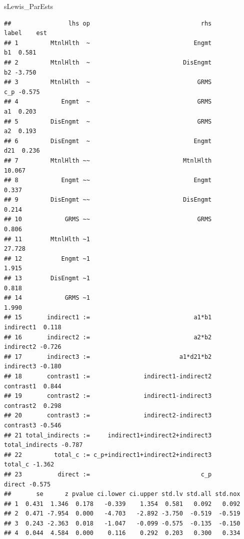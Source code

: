 \documentclass[
  11pt,
]{book}
\newenvironment{Shaded}{\begin{snugshade}}{\end{snugshade}}
\newcommand{\NormalTok}[1]{#1}
\begin{document}
\begin{Shaded}
\begin{Highlighting}[]
\NormalTok{sLewis\_ParEsts}
\end{Highlighting}
\end{Shaded}

\begin{verbatim}
##                lhs op                               rhs           label    est
## 1         MtnlHlth  ~                             Engmt              b1  0.581
## 2         MtnlHlth  ~                          DisEngmt              b2 -3.750
## 3         MtnlHlth  ~                              GRMS             c_p -0.575
## 4            Engmt  ~                              GRMS              a1  0.203
## 5         DisEngmt  ~                              GRMS              a2  0.193
## 6         DisEngmt  ~                             Engmt             d21  0.236
## 7         MtnlHlth ~~                          MtnlHlth                 10.067
## 8            Engmt ~~                             Engmt                  0.337
## 9         DisEngmt ~~                          DisEngmt                  0.214
## 10            GRMS ~~                              GRMS                  0.806
## 11        MtnlHlth ~1                                                   27.728
## 12           Engmt ~1                                                    1.915
## 13        DisEngmt ~1                                                    0.818
## 14            GRMS ~1                                                    1.990
## 15       indirect1 :=                             a1*b1       indirect1  0.118
## 16       indirect2 :=                             a2*b2       indirect2 -0.726
## 17       indirect3 :=                         a1*d21*b2       indirect3 -0.180
## 18       contrast1 :=               indirect1-indirect2       contrast1  0.844
## 19       contrast2 :=               indirect1-indirect3       contrast2  0.298
## 20       contrast3 :=               indirect2-indirect3       contrast3 -0.546
## 21 total_indirects :=     indirect1+indirect2+indirect3 total_indirects -0.787
## 22         total_c := c_p+indirect1+indirect2+indirect3         total_c -1.362
## 23          direct :=                               c_p          direct -0.575
##       se      z pvalue ci.lower ci.upper std.lv std.all std.nox
## 1  0.431  1.346  0.178   -0.339    1.354  0.581   0.092   0.092
## 2  0.471 -7.954  0.000   -4.703   -2.892 -3.750  -0.519  -0.519
## 3  0.243 -2.363  0.018   -1.047   -0.099 -0.575  -0.135  -0.150
## 4  0.044  4.584  0.000    0.116    0.292  0.203   0.300   0.334

\end{verbatim}
\end{document}
